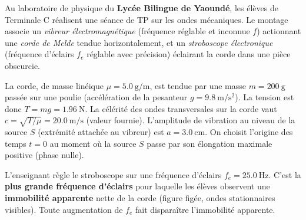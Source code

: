 \documentclass[11pt]{article}
\newcounter{popsec}
\newcounter{popsub}
\newcommand{\courssub}[1]{%
  \stepcounter{popsub}%
  \par\vspace{9pt}\noindent{\popxbold\fontsize{11.5}{13}\selectfont\color{popink}{\color{poporange}\thepopsec.\thepopsub}\hspace{6pt}#1}\par\nopagebreak\vspace{4pt}
}
\begin{document}
\courssub{Situation}
Au laboratoire de physique du \textbf{Lycée Bilingue de Yaoundé}, les élèves de Terminale C réalisent une séance de TP sur les ondes mécaniques. Le montage associe un \emph{vibreur électromagnétique} (fréquence réglable et inconnue $f$) actionnant une \emph{corde de Melde} tendue horizontalement, et un \emph{stroboscope électronique} (fréquence d'éclairs $f_e$ réglable avec précision) éclairant la corde dans une pièce obscurcie.

La corde, de masse linéique $\mu = \SI{5,0}{\gram\per\meter}$, est tendue par une masse $m = \SI{200}{\gram}$ passée sur une poulie (accélération de la pesanteur $g = \SI{9,8}{\meter\per\second\squared}$). La tension est donc $T = mg = \SI{1,96}{\newton}$. La célérité des ondes transversales sur la corde vaut $c = \sqrt{T/\mu} = \SI{20,0}{\meter\per\second}$ (valeur fournie). L'amplitude de vibration au niveau de la source $S$ (extrémité attachée au vibreur) est $a = \SI{3,0}{\centi\meter}$. On choisit l'origine des temps $t=0$ au moment où la source $S$ passe par son élongation maximale positive (phase nulle).

L'enseignant règle le stroboscope sur une fréquence d'éclairs $f_e = \SI{25,0}{\hertz}$. C'est la \textbf{plus grande fréquence d'éclairs} pour laquelle les élèves observent une \textbf{immobilité apparente} nette de la corde (figure figée, ondes stationnaires visibles). Toute augmentation de $f_e$ fait disparaître l'immobilité apparente.
\end{document}
